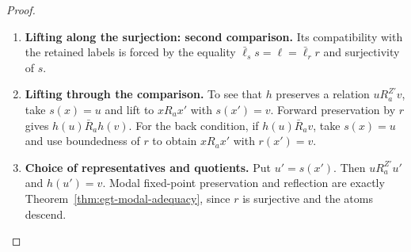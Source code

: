 \documentclass[11pt,a4paper]{article}
\numberwithin{equation}{section}
\theoremstyle{definition}
\theoremstyle{remark}
\theoremstyle{plain}
\begin{document}
\begin{proof}
\begin{enumerate}[label=\textup{(\arabic*)},leftmargin=*,itemsep=4pt,topsep=3pt]
map $h:Z'\twoheadrightarrow Z$ with $hs=r$.
  \item \textbf{Lifting along the surjection: second comparison.} Its compatibility with the
retained labels is forced by the equality
$\bar\ell_s s=\ell=\bar\ell_r r$ and surjectivity of $s$.
  \item \textbf{Lifting through the comparison.} To see that $h$ preserves a relation $uR_a^{Z'}v$, take $s(x)=u$ and
lift to $xR_ax'$ with $s(x')=v$. Forward preservation by $r$ gives
$h(u)\bar R_ah(v)$. For the back condition, if $h(u)\bar R_av$,
take $s(x)=u$ and use boundedness of $r$ to obtain $xR_ax'$ with
$r(x')=v$.
  \item \textbf{Choice of representatives and quotients.} Put $u'=s(x')$. Then $uR_a^{Z'}u'$ and $h(u')=v$. Modal fixed-point preservation and reflection are exactly Theorem~\ref{thm:egt-modal-adequacy}, since $r$ is surjective and the atoms
descend.
\end{enumerate}
\end{proof}
\end{document}
